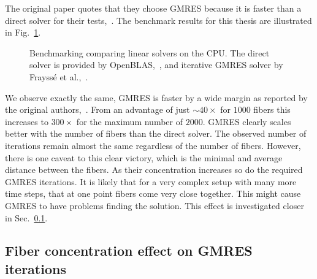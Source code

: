 The original paper quotes that they choose GMRES because it is faster than a direct solver for their tests,~\cite{Tornberg2006}. The benchmark results for this thesis are illustrated in Fig.~\ref{fig:bench_openmp_solvers}.

\begin{figure}[!htbp]
  \centering
  \caption[Benchmark linear solvers on CPU.]{Benchmarking comparing linear solvers on the CPU. The direct solver is provided by OpenBLAS,~\cite{OpenBLAS}, and iterative GMRES solver by Frayssé et al.,~\cite{Fraysse2003}.}
  \label{fig:bench_openmp_solvers}
\end{figure}

We observe exactly the same, GMRES is faster by a wide margin as reported by the original authors,~\cite{Tornberg2006}. From an advantage of just ${\sim}40×$ for $1000$ fibers this increases to $300×$ for the maximum number of $2000$. GMRES clearly scales better with the number of fibers than the direct solver. The observed number of iterations remain almost the same regardless of the number of fibers. However, there is one caveat to this clear victory, which is the minimal and average distance between the fibers. As their concentration increases so do the required GMRES iterations. It is likely that for a very complex setup with many more time steps, that at one point fibers come very close together. This might cause GMRES to have problems finding the solution. This effect is investigated closer in Sec.~\ref{subsec:example_concentration_gmres}.

\subsection{Fiber concentration effect on GMRES iterations}
\label{subsec:example_concentration_gmres}

